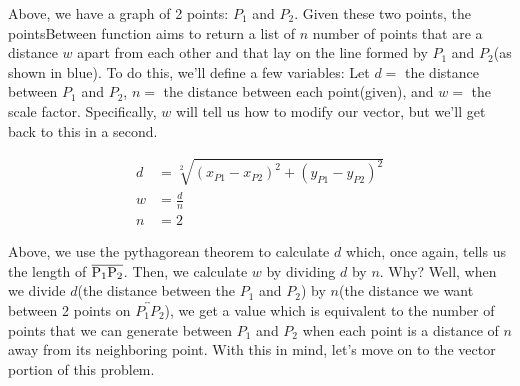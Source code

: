 \documentclass[14pt]{article}
\begin{document}
\begin{center}
	\vspace{2em}
	\vspace{2em}
\end{center}

Above, we have a graph of 2 points: $P_1$ and $P_2$. Given these two points, the pointsBetween function aims to return a list of $n$ number of points that are a distance $w$ apart from each other and that lay on the line formed by $P_1$ and $P_2$(as shown in blue). To do this, we'll define a few variables: Let $d =$ the distance between $P_1$ and $P_2$, $n =$ the distance between each point(given), and $w =$ the scale factor. Specifically, $w$ will tell us how to modify our vector, but we'll get back to this in a second.


\begin{equation}
\begin{aligned}
	d &= \sqrt[2]{(x_{P1} - x_{P2})^2 + (y_{P1} - y_{P2})^2} \\
	w &= \frac{d}{n} \\
	n &= 2
\end{aligned}
\end{equation}

\vspace{1em}

Above, we use the pythagorean theorem to calculate $d$ which, once again, tells us the length of $\overline{\rm P_1P_2}$. Then, we calculate $w$ by dividing $d$ by $n$. Why? Well, when we divide $d$(the distance between the $P_1$ and $P_2$) by $n$(the distance we want between 2 points on $\overleftrightarrow{P_1P_2}$), we get a value which is equivalent to the number of points that we can generate between $P_1$ and $P_2$ when each point is a distance of $n$ away from its neighboring point. With this in mind, let's move on to the vector portion of this problem.
\end{document}
